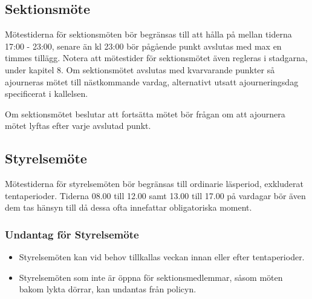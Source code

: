 \documentclass[]{dsekprotokoll}
\begin{document}
\subsection{Sektionsmöte}
Mötestiderna för sektionsmöten bör begränsas till att hålla på mellan tiderna 17:00 -
23:00, senare än kl 23:00 bör pågående punkt avslutas med max en timmes tillägg.
Notera att mötestider för sektionsmötet även regleras i stadgarna, under kapitel 8. Om sektionsmötet avslutas med kvarvarande punkter så ajourneras mötet till nästkommande vardag, alternativt utsatt ajourneringsdag specificerat i kallelsen.

Om sektionsmötet beslutar att fortsätta mötet bör frågan om att ajournera mötet lyftas
efter varje avslutad punkt.

\subsection{Styrelsemöte}
Mötestiderna för styrelsemöten bör begränsas till ordinarie läsperiod, exkluderat tentaperioder. Tiderna 08.00 till 12.00 samt 13.00 till 17.00 på vardagar bör även dem tas hänsyn till då dessa ofta innefattar obligatoriska moment.

\subsubsection{Undantag för Styrelsemöte}
\begin{itemize}
    \item Styrelsemöten kan vid behov tillkallas veckan innan eller efter tentaperioder.
    \item Styrelsemöten som inte är öppna för sektionsmedlemmar, såsom möten bakom lykta dörrar, kan undantas från policyn.
\end{itemize}
\end{document}
